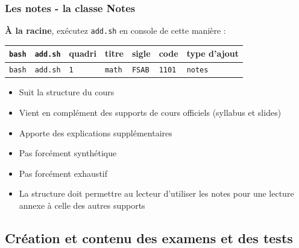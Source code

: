 \documentclass{beamer}
\begin{document}
\begin{frame}
    \frametitle{Les notes - la classe Notes}
    \begin{exampleblock}{\textbf{À la racine}, exécutez \lstinline|add.sh| en
    console de cette manière :}
       \begin{tabular}{lllllll}
           \lstinline|bash| & \lstinline|add.sh| & quadri & titre & sigle & code & type d'ajout
           \\ \hline
           \lstinline|bash| & \lstinline|add.sh| & \lstinline|1| & \lstinline|math| & \lstinline|FSAB| & \lstinline|1101| & \lstinline|notes| \\
       \end{tabular}
    \end{exampleblock}
    \bigskip

    \begin{itemize}
        \item Suit la structure du cours
        \item Vient en complément des supports de cours officiels
            (syllabus et slides)
        \item Apporte des explications supplémentaires
        \item Pas forcément synthétique
        \item Pas forcément exhaustif
        \item La structure doit permettre au lecteur d'utiliser les
            notes pour une lecture annexe à celle des autres supports
    \end{itemize}
\end{frame}

\subsection{Création et contenu des examens et des tests}
\end{document}
